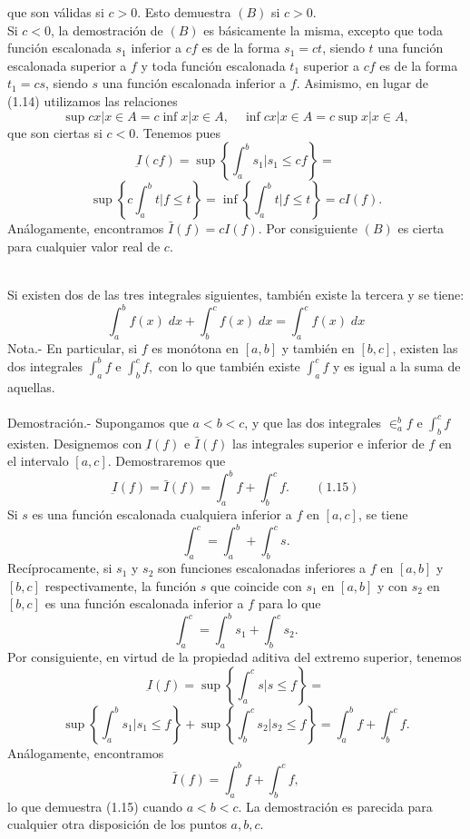 \begin{multicols}{2}
\begin{teo}
    que son válidas si $c>0$. Esto demuestra $(B)$ si $c>0$.\\
    Si $c<0$, la demostración de $(B)$ es básicamente la misma, excepto que toda función escalonada $s_1$ inferior a $cf$ es de la forma $s_1=ct$, siendo $t$ una función escalonada superior a $f$ y toda función escalonada $t_1$ superior a $cf$ es de la forma $t_1=cs$, siendo $s$ una función escalonada inferior a $f$. Asimismo, en lugar de (1.14) utilizamos las relaciones 
    $$\sup{cx | x\in A} = c\inf{x | x \in A}, \quad \inf{cx | x \in A} = c \sup {x | x \in A},$$
    que son ciertas si $c<0$. Tenemos pues 
    $$\underbar{I}(cf) = \sup\left\{\int_a^b s_1 | s_1 \leq cf\right\}= $$$$\sup \left\{c \int_a^b t | f \leq t\right\} = \inf \left\{\int_a^b t | f \leq t\right\} = cI(f).$$
    Análogamente, encontramos $\bar{I}(f)=cI(f)$. Por consiguiente $(B)$ es cierta para cualquier valor real de $c$.\\\\

\end{teo}

\begin{teo} Si existen dos de las tres integrales siguientes, también existe la tercera y se tiene: $$\int_a^b f(x) \; dx + \int_b^c f(x) \; dx = \int_a^c f(x) \; dx$$
    Nota.- \; En particular, si $f$ es monótona en $[a,b]$ y también en $[b,c]$, existen las dos integrales $\int_a^b f$ e $\int_b^c f,$ con lo que también existe $\int_a^c f$ y es igual a la suma de aquellas.\\\\
    Demostración.-\; Supongamos que $a<b<c$, y que las dos integrales $\in_a^b f$ e $\int_b^c f$ existen. Designemos con $\underbar{I}(f)$ e $\bar{I}(f)$ las integrales superior e inferior de $f$ en el intervalo $[a,c]$. Demostraremos que $$\underbar{I}(f) = \bar{I}(f) = \int_a^b f + \int_b^c f. \qquad (1.15)$$
    Si $s$ es una función escalonada cualquiera inferior a $f$ en $[a,c]$, se tiene $$\int_a^c = \int_a^b + \int_b^c s.$$
    Recíprocamente, si $s_1$ y $s_2$ son funciones escalonadas inferiores a $f$ en $[a,b]$ y $[b,c]$ respectivamente, la función $s$ que coincide con $s_1$ en $[a,b]$ y con $s_2$ en $[b,c]$ es una función escalonada inferior a $f$ para lo que $$\int_a^c = \int_a^b s_1 + \int_b^c s_2.$$
    Por consiguiente, en virtud de la propiedad aditiva del extremo superior, tenemos 
    $$\underbar{I}(f) = \sup\left\{\int_a^c s | s\leq f\right\} =$$$$ \sup \left\{\int_a^b s_1 | s_1 \leq f\right\} + \sup \left\{\int_b^c s_2 | s_2 \leq f\right\} = \int_a^b f + \int_b^c f.$$
    Análogamente, encontramos $$\bar{I}(f) = \int_a^b f + \int_b^c f,$$
    lo que demuestra (1.15) cuando $a<b<c$. La demostración es parecida para cualquier otra disposición de los puntos $a,b,c$.\\\\


\end{teo}
\end{multicols}
